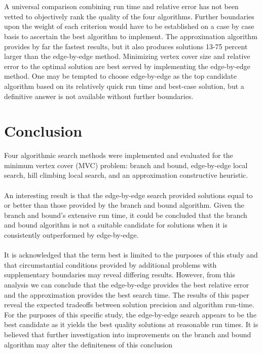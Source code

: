 \documentclass{sig-alternate-05-2015}
\begin{document}
\\
\\
	A universal comparison combining run time and relative error has not been vetted to objectively rank the quality of the four algorithms.  Further boundaries upon the weight of each criterion would have to be established on a case by case basis to ascertain the best algorithm to implement.  The approximation algorithm provides by far the fastest results, but it also produces solutions 13-75 percent larger than the edge-by-edge method.  Minimizing vertex cover size and relative error to the optimal solution are best served by implementing the edge-by-edge method.  One may be tempted to choose edge-by-edge as the top candidate algorithm based on its relatively quick run time and best-case solution, but a definitive answer is not available without further boundaries.

\section{Conclusion}
Four algorithmic search methods were implemented and evaluated for the minimum vertex cover (MVC) problem:  branch and bound, edge-by-edge local search, hill climbing local search, and an approximation constructive heuristic. 
\\
\\
            An interesting result is that the edge-by-edge search provided solutions equal to or better than those provided by the branch and bound algorithm. Given the branch and bound's extensive run time, it could be concluded that the branch and bound algorithm is not a suitable candidate for solutions when it is consistently outperformed by edge-by-edge.
\\
\\
            It is acknowledged that the term best is limited to the purposes of this study and that circumstantial conditions provided by additional problems with supplementary boundaries may reveal differing results. However, from this analysis we can conclude that the edge-by-edge provides the best relative error and the approximation provides the best search time. The results of this paper reveal the expected tradeoffs between solution precision and algorithm run-time.  For the purposes of this specific study, the edge-by-edge search appears to be the best candidate as it yields the best quality solutions at reasonable run times.  It is believed that further investigation into improvements on the branch and bound algorithm may alter the definiteness of this conclusion
\end{document}
